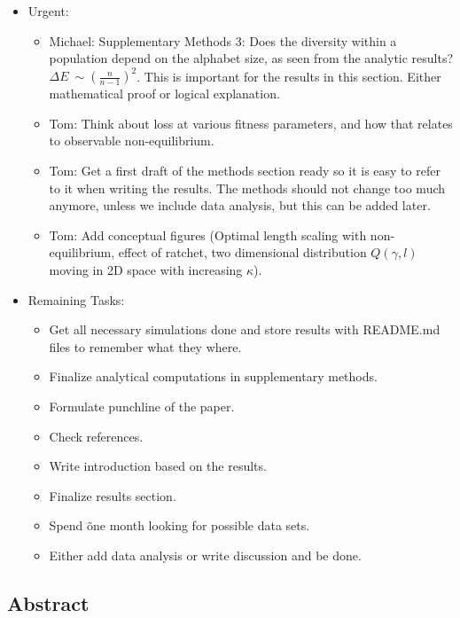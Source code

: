 \documentclass[10pt,a4paper]{article}
\begin{document}
	\begin{itemize}
		\color{ForestGreen}
		\item Urgent:
		\begin{itemize}
			\item Michael: Supplementary Methods 3: Does the diversity within a population depend on the alphabet size, as seen from the analytic results? $\Delta E ~\sim \left(\frac{n}{n-1}\right)^2$. This is important for the results in this section. Either mathematical proof or logical explanation.
			\item Tom: Think about loss at various fitness parameters, and how that relates to observable non-equilibrium.
			\item Tom: Get a first draft of the methods section ready so it is easy to refer to it when writing the results. The methods should not change too much anymore, unless we include data analysis, but this can be added later.
			\item Tom: Add conceptual figures (Optimal length scaling with non-equilibrium, effect of ratchet, two dimensional distribution $Q(\gamma, l)$ moving in 2D space with increasing $\kappa$).
		\end{itemize}
		\item Remaining Tasks:
		\begin{itemize}
			\item Get all necessary simulations done and store results with README.md files to remember what they where.
			\item Finalize analytical computations in supplementary methods.
			\item Formulate punchline of the paper.
			\item Check references.
			\item Write introduction based on the results.
			\item Finalize results section.
			\item Spend \~ one month looking for possible data sets.
			\item Either add data analysis or write discussion and be done.
		\end{itemize}
	\end{itemize}
	
	\subsection*{Abstract}
	
\end{document}
